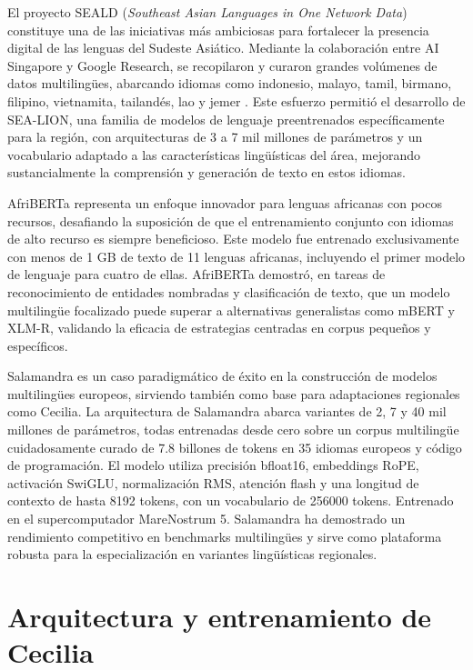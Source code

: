 \documentclass[10pt,twoside]{rcmart} %
\begin{document}
El proyecto SEALD (\textit{Southeast Asian Languages in One Network Data}) constituye una de las iniciativas más ambiciosas para fortalecer la presencia digital de las lenguas del Sudeste Asiático. Mediante la colaboración entre AI Singapore y Google Research, se recopilaron y curaron grandes volúmenes de datos multilingües, abarcando idiomas como indonesio, malayo, tamil, birmano, filipino, vietnamita, tailandés, lao y jemer \cite{ng2025sea}. Este esfuerzo permitió el desarrollo de SEA-LION, una familia de modelos de lenguaje preentrenados específicamente para la región, con arquitecturas de 3 a 7 mil millones de parámetros y un vocabulario adaptado a las características lingüísticas del área, mejorando sustancialmente la comprensión y generación de texto en estos idiomas.

AfriBERTa \cite{ogueji2021small} representa un enfoque innovador para lenguas africanas con pocos recursos, desafiando la suposición de que el entrenamiento conjunto con idiomas de alto recurso es siempre beneficioso. Este modelo fue entrenado exclusivamente con menos de 1 GB de texto de 11 lenguas africanas, incluyendo el primer modelo de lenguaje para cuatro de ellas. AfriBERTa demostró, en tareas de reconocimiento de entidades nombradas y clasificación de texto, que un modelo multilingüe focalizado puede superar a alternativas generalistas como mBERT y XLM-R, validando la eficacia de estrategias centradas en corpus pequeños y específicos.

Salamandra \cite{gonzalez2025salamandra} es un caso paradigmático de éxito en la construcción de modelos multilingües europeos, sirviendo también como base para adaptaciones regionales como Cecilia. La arquitectura de Salamandra abarca variantes de 2, 7 y 40 mil millones de parámetros, todas entrenadas desde cero sobre un corpus multilingüe cuidadosamente curado de 7.8 billones de tokens en 35 idiomas europeos y código de programación. El modelo utiliza precisión bfloat16, embeddings RoPE, activación SwiGLU, normalización RMS, atención flash y una longitud de contexto de hasta 8192 tokens, con un vocabulario de 256000 tokens. Entrenado en el supercomputador MareNostrum 5. Salamandra ha demostrado un rendimiento competitivo en benchmarks multilingües y sirve como plataforma robusta para la especialización en variantes lingüísticas regionales.

\section{Arquitectura y entrenamiento de Cecilia}\label{sec:arq-training}
\end{document}
